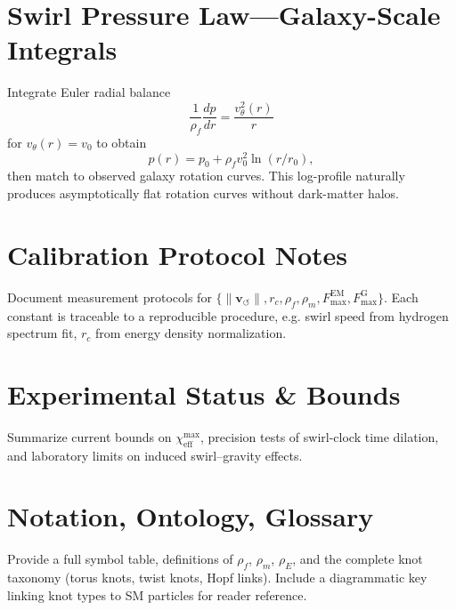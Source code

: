 \documentclass[10pt,reprint,aps,onecolumn,nofootinbib]{revtex4-2}
\begin{document}
    \section{Swirl Pressure Law—Galaxy-Scale Integrals}
    \label{canon58:appF}
    Integrate Euler radial balance
    \[
        \frac{1}{\rho_{\!f}}\frac{dp}{dr} = \frac{v_{\theta}^{2}(r)}{r}
    \]
    for $v_\theta(r)=v_0$ to obtain
    \[
        p(r) = p_0 + \rho_{\!f} v_0^{2} \ln(r/r_0),
    \]
    then match to observed galaxy rotation curves. This log-profile naturally
    produces asymptotically flat rotation curves without dark-matter halos.

    \section{Calibration Protocol Notes}
    \label{canon58:appG}
    Document measurement protocols for
    $\{\lVert \mathbf{v}_{\!\boldsymbol{\circlearrowleft}}\rVert, r_c, \rho_{\!f}, \rho_{\!m},
    F_{\max}^{\mathrm{EM}}, F_{\max}^{\mathrm{G}}\}$.
    Each constant is traceable to a reproducible procedure, e.g.
    swirl speed from hydrogen spectrum fit, $r_c$ from energy density normalization.

    \section{Experimental Status \& Bounds}
    \label{canon58:appH}
    Summarize current bounds on $\chi_{\mathrm{eff}}^{\max}$,
    precision tests of swirl-clock time dilation,
    and laboratory limits on induced swirl–gravity effects.

    \section{Notation, Ontology, Glossary}
    \label{canon58:appI}
    Provide a full symbol table, definitions of $\rho_{\!f}$, $\rho_{\!m}$, $\rho_{\!E}$,
    and the complete knot taxonomy (torus knots, twist knots, Hopf links).
    Include a diagrammatic key linking knot types to SM particles for reader reference.
\end{document}
